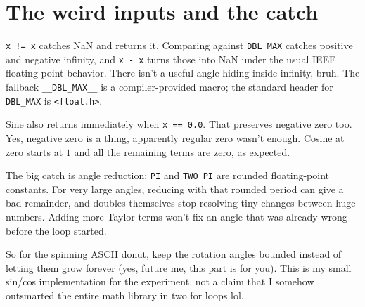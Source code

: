 \documentclass{article}
\begin{document}
\section*{The weird inputs and the catch}

\verb|x != x| catches NaN and returns it. Comparing against
\texttt{DBL\_MAX} catches positive and negative infinity, and
\verb|x - x| turns those into NaN under the usual IEEE floating-point
behavior. There isn't a useful angle hiding inside infinity, bruh.
The fallback \texttt{\_\_DBL\_MAX\_\_} is a compiler-provided macro;
the standard header for \texttt{DBL\_MAX} is \texttt{<float.h>}.

Sine also returns immediately when \texttt{x == 0.0}. That preserves negative
zero too. Yes, negative zero is a thing, apparently regular zero wasn't enough.
Cosine at zero starts at $1$ and all the remaining terms are zero, as expected.

The big catch is angle reduction: \texttt{PI} and \texttt{TWO\_PI} are rounded
floating-point constants. For very large angles, reducing with that rounded
period can give a bad remainder, and doubles themselves stop resolving tiny
changes between huge numbers. Adding more Taylor terms won't fix an angle
that was already wrong before the loop started.

So for the spinning ASCII donut, keep the rotation angles bounded instead of
letting them grow forever (yes, future me, this part is for you). This is my
small sin/cos implementation for the experiment, not a claim that I somehow
outsmarted the entire math library in two for loops lol.
\end{document}
